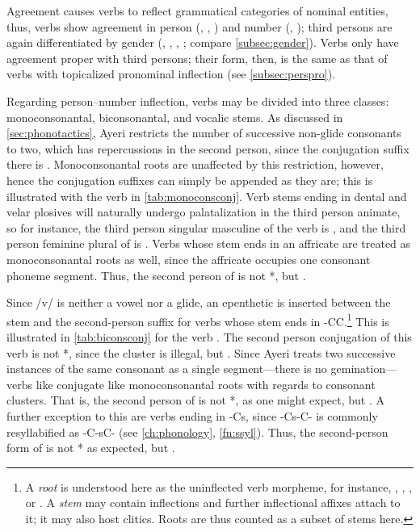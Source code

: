 Agreement causes verbs to reflect grammatical categories of nominal entities,
thus, verbs show agreement in person (\First{}, \Second{}, \Third{}) and number
(\Sg{}, \Pl{}); third persons are again differentiated by gender (\M{}, \F{},
\N{}, \Inan{}; compare \autoref{subsec:gender}). Verbs only have agreement
proper with third persons; their form, then, is the same as that of verbs with
topicalized pronominal inflection (see \autoref{subsec:perspro}).

Regarding person--number inflection, verbs may be divided into three classes: 
monoconsonantal, biconsonantal, and vocalic stems. As discussed in 
\autoref{sec:phonotactics}, Ayeri restricts the number of successive non-glide 
consonants to two, which has repercussions in the second person, since the 
conjugation suffix there is . Monoconsonantal roots are 
unaffected by this restriction, however, hence the conjugation suffixes can 
simply be appended as they are; this is illustrated with the verb 
 in \autoref{tab:monoconsconj}. Verb stems 
ending in dental and velar plosives will naturally undergo palatalization in 
the third person animate, so for instance, the third person singular masculine 
of the verb  is , and the third person feminine plural of  is . Verbs whose 
stem ends in an affricate are treated as monoconsonantal roots as well, since 
the affricate occupies one consonant phoneme segment. Thus, the second 
person of  is not *, but 
.

Since /v/ is neither a vowel nor a glide, an epenthetic  is inserted
between the stem and the second-person suffix  for verbs whose
stem ends in -CC.\footnote{A \emph{root} is understood here as the uninflected
verb morpheme, for instance, , ,
, or . A \emph{stem} may contain inflections
and further inflectional affixes attach to it; it may also host clitics. Roots
are thus counted as a subset of stems here.} This is illustrated in
\autoref{tab:biconsconj} for the verb . The second
person conjugation of this verb is not *, since the
cluster  is illegal, but . Since Ayeri treats two
successive instances of the same consonant as a single segment---there is no
gemination---verbs like  conjugate like
monoconsonantal roots with regards to consonant clusters. That is, the second
person of  is not *, as one might
expect, but . A further exception to this are verbs
ending in -Cs, since -Cs-C- is commonly resyllabified as -C-sC- (see
\autoref{ch:phonology}, \autoref{fn:ssyl}). Thus, the second-person form of
 is not * as expected, but
.

